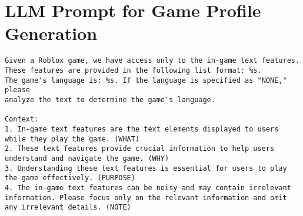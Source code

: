 \appendix
\section{LLM Prompt for Game Profile Generation}
\label{sec:game_profile_generation}

\begin{lstlisting}
Given a Roblox game, we have access only to the in-game text features.
These features are provided in the following list format: %s.
The game's language is: %s. If the language is specified as "NONE," please
analyze the text to determine the game's language.

Context:
1. In-game text features are the text elements displayed to users while they play the game. (WHAT)
2. These text features provide crucial information to help users understand and navigate the game. (WHY)
3. Understanding these text features is essential for users to play the game effectively. (PURPOSE)
4. The in-game text features can be noisy and may contain irrelevant information. Please focus only on the relevant information and omit any irrelevant details. (NOTE)


\end{lstlisting}
